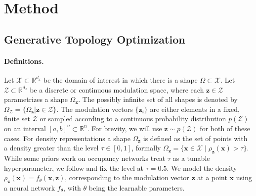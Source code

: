 \section{Method}


\subsection{Generative Topology Optimization}


\paragraph{Definitions.}
Let $\mathcal{X} \subset \mathbb{R}^{d_x}$
be the domain of interest in which there is a shape $\Omega \subset \mathcal{X}$. 
Let $\mathcal{Z} \subset \mathbb{R}^{d_z}$ be a discrete or continuous modulation space, where each $\mathbf{z} \in \mathcal{Z}$ parametrizes a shape $\Omega_\mathbf{z}$. The possibly infinite set of all shapes is denoted by $\Omega_\mathcal{Z} = \{ \Omega_\mathbf{z} | \mathbf{z} \in \mathcal{Z} \}$.
The modulation vectors $\{\mathbf{z}_{i} \}$ are either elements in a fixed, finite set $\mathcal{Z}$ or sampled according to a continuous probability distribution $p(\mathcal{Z})$ on an interval $[a, b]^n \subset \mathbb{R}^n$. For brevity, we will use $\mathbf{z} \sim p(\mathcal{Z})$ for both of these cases. \newline
For density representations a shape $\Omega_\mathbf{z}$ is defined as the set of points with a density greater than the level $\tau \in [0,1]$, formally $\Omega_\mathbf{z} = \{\mathbf{x} \in \mathcal{X} \mid \rho_\mathbf{z}(\mathbf{x}) > \tau \}$.
While some priors work on occupancy networks \citep{Occupancy_Networks} treat $\tau$ as a tunable hyperparameter, we follow \citet{fenitop} and fix the level at $\tau = 0.5$. 
We model the density $\rho_\mathbf{z}(\mathbf{x}) = f_\theta(\mathbf{x}, \mathbf{z})$, corresponding to the modulation vector $\mathbf{z}$ at a point $\mathbf{x}$ using a neural network $f_\theta$, with $\theta$ being the learnable parameters. 

